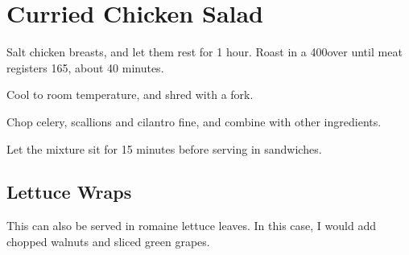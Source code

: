 

\section{Curried Chicken Salad}
\begin{recipe}



Salt chicken breasts, and let them rest for 1 hour. Roast in a 400\degree over until meat registers 165\degree, about 40 minutes.

Cool to room temperature, and shred with a fork.


Chop celery, scallions and cilantro fine, and combine with other ingredients.

Let the mixture sit for 15 minutes before serving in sandwiches.

\columnbreak
\subsection{Lettuce Wraps}

This can also be served in romaine lettuce leaves. In this case, I would  add chopped walnuts and sliced green grapes.

\end{recipe}
